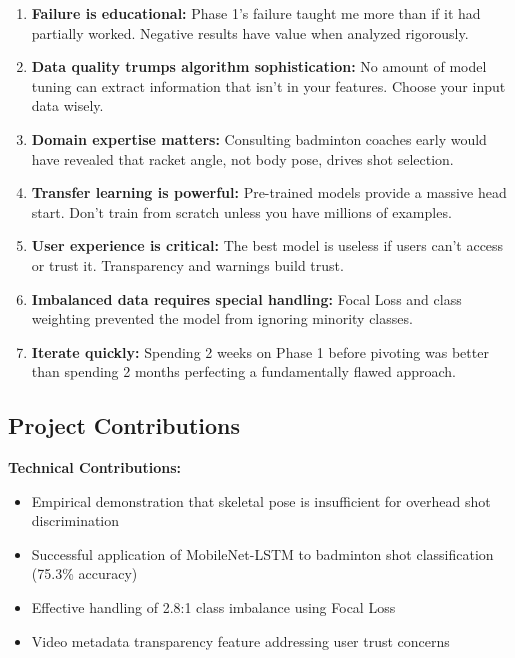 \documentclass[11pt,a4paper]{article}
\begin{document}
\begin{enumerate}
\item \textbf{Failure is educational:} Phase 1's failure taught me more than if it had partially worked. Negative results have value when analyzed rigorously.

\item \textbf{Data quality trumps algorithm sophistication:} No amount of model tuning can extract information that isn't in your features. Choose your input data wisely.

\item \textbf{Domain expertise matters:} Consulting badminton coaches early would have revealed that racket angle, not body pose, drives shot selection.

\item \textbf{Transfer learning is powerful:} Pre-trained models provide a massive head start. Don't train from scratch unless you have millions of examples.

\item \textbf{User experience is critical:} The best model is useless if users can't access or trust it. Transparency and warnings build trust.

\item \textbf{Imbalanced data requires special handling:} Focal Loss and class weighting prevented the model from ignoring minority classes.

\item \textbf{Iterate quickly:} Spending 2 weeks on Phase 1 before pivoting was better than spending 2 months perfecting a fundamentally flawed approach.
\end{enumerate}

\subsection{Project Contributions}

\textbf{Technical Contributions:}
\begin{itemize}
\item Empirical demonstration that skeletal pose is insufficient for overhead shot discrimination
\item Successful application of MobileNet-LSTM to badminton shot classification (75.3\% accuracy)
\item Effective handling of 2.8:1 class imbalance using Focal Loss
\item Video metadata transparency feature addressing user trust concerns
\end{itemize}
\end{document}
